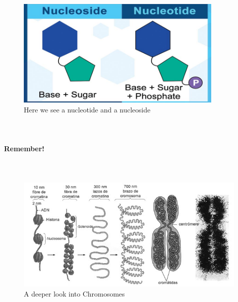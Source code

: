 \paragraph{\\}
\begin{figure}[htbp]
    \centerline{\includegraphics[width=100mm]{nucleotide.jpg}}
    \caption{Here we see a nucleotide and a nucleoside}
    \label{fig2}
\end{figure}

\paragraph{\\}
\paragraph{Remember!}


\paragraph{\\}
\begin{figure}[htbp]
    \centerline{\includegraphics[width=185mm]{adn3.jpg}}
    \caption{A deeper look into Chromosomes}
    \label{fig3}
\end{figure}